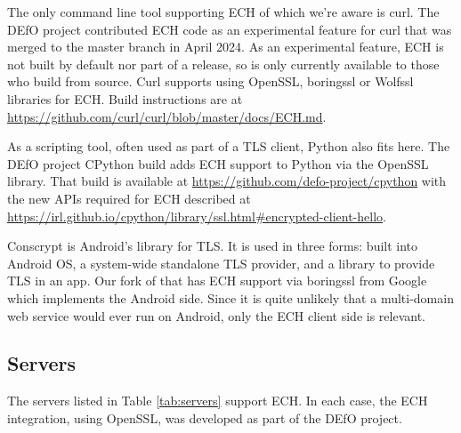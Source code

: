 The only command line tool supporting ECH of which we're aware is curl. The
DEfO project
contributed ECH code as an experimental feature for curl that was merged to the
master branch in April 2024. As an experimental feature, ECH is not built by
default nor part of a release, so is only currently available to those who
build from source. Curl supports using OpenSSL, boringssl or Wolfssl libraries
for ECH.  Build instructions are at
\url{https://github.com/curl/curl/blob/master/docs/ECH.md}.

As a scripting tool, often used as part of a TLS client, Python also fits here.
The DEfO project CPython build adds ECH support to Python via the OpenSSL
library.  That build is available at
\url{https://github.com/defo-project/cpython} with the new APIs required for
ECH described at
\url{https://irl.github.io/cpython/library/ssl.html#encrypted-client-hello}.

Conscrypt is Android's library for TLS. It is used in three forms: built into
Android OS, a system-wide standalone TLS provider, and a library to provide TLS
in an app. Our fork of that has ECH support via boringssl from Google 
which implements the Android side. Since it is quite unlikely that a
multi-domain web service would ever run on Android, only the ECH client side is
relevant.

\subsection{Servers}


The servers listed in Table \ref{tab:servers} support ECH. In each case,
the ECH integration, using OpenSSL, was developed as part of the DEfO
project.

